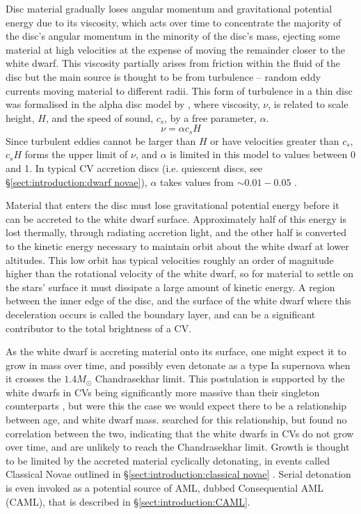 Disc material gradually loses angular momentum and gravitational potential energy due to its viscosity, which acts over time to concentrate the majority of the disc's angular momentum in the minority of the disc's mass, ejecting some material at high velocities at the expense of moving the remainder closer to the white dwarf. 
This viscosity partially arises from friction within the fluid of the disc but the main source is thought to be from turbulence -- random eddy currents moving material to different radii. 
This form of turbulence in a thin disc was formalised in the alpha disc model by \citet{shakura1973}, where viscosity, $\nu$, is related to scale height, $H$, and the speed of sound, $c_s$, by a free parameter, $\alpha$.
\begin{equation}
    \label{eqn:disc viscocity}
    \nu = \alpha c_s H
\end{equation}
Since turbulent eddies cannot be larger than $H$ or have velocities greater than $c_s$, $c_s H$ forms the upper limit of $\nu$, and $\alpha$ is limited in this model to values between 0 and 1. In typical CV accretion discs (i.e. quiescent discs, see \S\ref{sect:introduction:dwarf novae}), $\alpha$ takes values from $\sim 0.01 - 0.05$ \citep{hellier2001}.

Material that enters the disc must lose gravitational potential energy before it can be accreted to the white dwarf surface. Approximately half of this energy is lost thermally, through radiating accretion light, and the other half is converted to the kinetic energy necessary to maintain orbit about the white dwarf at lower altitudes. This low orbit has typical velocities roughly an order of magnitude higher than the rotational velocity of the white dwarf, so for material to settle on the stars' surface it must dissipate a large amount of kinetic energy. A region between the inner edge of the disc, and the surface of the white dwarf where this deceleration occurs is called the boundary layer, and can be a significant contributor to the total brightness of a CV. 

As the white dwarf is accreting material onto its surface, one might expect it to grow in mass over time, and possibly even detonate as a type Ia supernova when it crosses the $1.4 M_\odot$ Chandrasekhar limit. This postulation is supported by the white dwarfs in CVs being significantly more massive than their singleton counterparts \citep{zorotovic2011}, but were this the case we would expect there to be a relationship between age, and white dwarf mass. \citet{McAllister2019} searched for this relationship, but found no correlation between the two, indicating that the white dwarfs in CVs do not grow over time, and are unlikely to reach the Chandrasekhar limit. Growth is thought to be limited by the accreted material cyclically detonating, in events called Classical Novae outlined in \S\ref{sect:introduction:classical novae} \citep{Wijnen2015,sparks2021}. Serial detonation is even invoked as a potential source of AML, dubbed Consequential AML (CAML), that is described in \S\ref{sect:introduction:CAML}.



